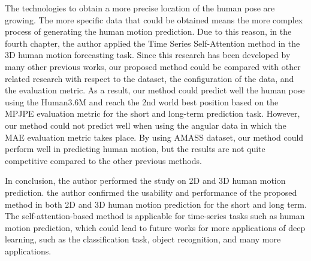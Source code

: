 The technologies to obtain a more precise location of the human pose are growing. The more specific data that could be obtained means the more complex process of generating the human motion prediction. Due to this reason, in the fourth chapter, the author applied the Time Series Self-Attention method in the 3D human motion forecasting task. Since this research has been developed by many other previous works, our proposed method could be compared with other related research with respect to the dataset, the configuration of the data, and the evaluation metric. As a result, our method could predict well the human pose using the Human3.6M and reach the 2nd world best position based on the MPJPE evaluation metric for the short and long-term prediction task. However, our method could not predict well when using the angular data in which the MAE evaluation metric takes place. By using AMASS dataset, our method could perform well in predicting human motion, but the results are not quite competitive compared to the other previous methods.

In conclusion, the author performed the study on 2D and 3D human motion prediction. the author confirmed the usability and performance of the proposed method in both 2D and 3D human motion prediction for the short and long term. The self-attention-based method is applicable for time-series tasks such as human motion prediction, which could lead to future works for more applications of deep learning, such as the classification task, object recognition, and many more applications.



\ifpdf
    \graphicspath{{X/figures/PNG/}{X/figures/PDF/}{X/figures/}}
\else
    \graphicspath{{X/figures/EPS/}{X/figures/}}
\fi









